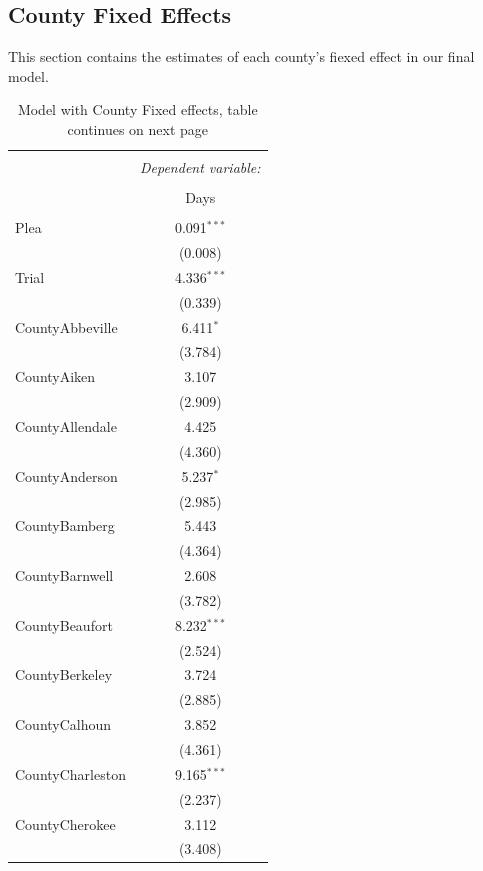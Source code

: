 \documentclass[11pt, oneside]{article}   	%
\theoremstyle{ModifiedStyle}
\begin{document}
	\subsection{County Fixed Effects}
	  \label{App:county-fixed-effects}
		This section contains the estimates of each county's fiexed effect in our final model.
		\begin{table}[H] \centering
			\caption{Model with County Fixed effects, table continues on next page}
			\small
			\begin{tabular}{@{\extracolsep{5pt}}lc}
			\\[-1.8ex]\hline
			\hline \\[-1.8ex]
			 & \multicolumn{1}{c}{\textit{Dependent variable:}} \\
			\cline{2-2}
			\\[-1.8ex] & Days \\
			\hline \\[-1.8ex]
			Plea & 0.091$^{***}$ \\
			 & (0.008) \\
			 Trial & 4.336$^{***}$ \\
			 & (0.339) \\
			 CountyAbbeville & 6.411$^{*}$ \\
			 & (3.784) \\
			 CountyAiken & 3.107 \\
			 & (2.909) \\
			 CountyAllendale & 4.425 \\
			 & (4.360) \\
			 CountyAnderson & 5.237$^{*}$ \\
			 & (2.985) \\
			 CountyBamberg & 5.443 \\
			 & (4.364) \\
			 CountyBarnwell & 2.608 \\
			 & (3.782) \\
			 CountyBeaufort & 8.232$^{***}$ \\
			 & (2.524) \\
			 CountyBerkeley & 3.724 \\
			 & (2.885) \\
			 CountyCalhoun & 3.852 \\
			 & (4.361) \\
			 CountyCharleston & 9.165$^{***}$ \\
			 & (2.237) \\
			 CountyCherokee & 3.112 \\
			 & (3.408) \\

\end{tabular}
\end{table}
\end{document}
